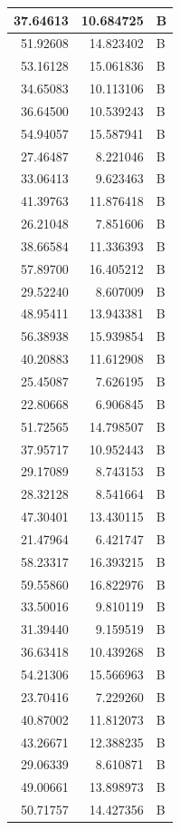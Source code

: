 \documentclass[
  letterpaper,
  DIV=11,
  numbers=noendperiod]{scrartcl}
\begin{document}
\begin{table}
\begin{tabular}[t]{r|r|l}
\hline
37.64613 & 10.684725 & B\\
\hline
51.92608 & 14.823402 & B\\
\hline
53.16128 & 15.061836 & B\\
\hline
34.65083 & 10.113106 & B\\
\hline
36.64500 & 10.539243 & B\\
\hline
54.94057 & 15.587941 & B\\
\hline
27.46487 & 8.221046 & B\\
\hline
33.06413 & 9.623463 & B\\
\hline
41.39763 & 11.876418 & B\\
\hline
26.21048 & 7.851606 & B\\
\hline
38.66584 & 11.336393 & B\\
\hline
57.89700 & 16.405212 & B\\
\hline
29.52240 & 8.607009 & B\\
\hline
48.95411 & 13.943381 & B\\
\hline
56.38938 & 15.939854 & B\\
\hline
40.20883 & 11.612908 & B\\
\hline
25.45087 & 7.626195 & B\\
\hline
22.80668 & 6.906845 & B\\
\hline
51.72565 & 14.798507 & B\\
\hline
37.95717 & 10.952443 & B\\
\hline
29.17089 & 8.743153 & B\\
\hline
28.32128 & 8.541664 & B\\
\hline
47.30401 & 13.430115 & B\\
\hline
21.47964 & 6.421747 & B\\
\hline
58.23317 & 16.393215 & B\\
\hline
59.55860 & 16.822976 & B\\
\hline
33.50016 & 9.810119 & B\\
\hline
31.39440 & 9.159519 & B\\
\hline
36.63418 & 10.439268 & B\\
\hline
54.21306 & 15.566963 & B\\
\hline
23.70416 & 7.229260 & B\\
\hline
40.87002 & 11.812073 & B\\
\hline
43.26671 & 12.388235 & B\\
\hline
29.06339 & 8.610871 & B\\
\hline
49.00661 & 13.898973 & B\\
\hline
50.71757 & 14.427356 & B\\

\end{tabular}
\end{table}
\end{document}
